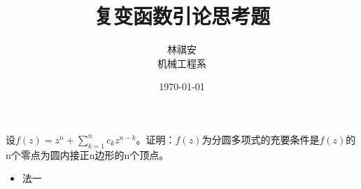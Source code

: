 \documentclass[18pt]{article}
\begin{document}
\title{复变函数引论思考题}  
\author { 林祺安 \\  
	机械工程系 \\}  
\date{\today}  
\maketitle
\section{} 设$f(z)=z^{n}+\sum\nolimits_{k=1}^{n}c_{k}z^{n-k}$。证明：$f(z)$为分圆多项式的充要条件是$f(z)$的n个零点为圆内接正n边形的n个顶点。\\


\begin{itemize}
\item 法一
\end{itemize}
\end{document}
